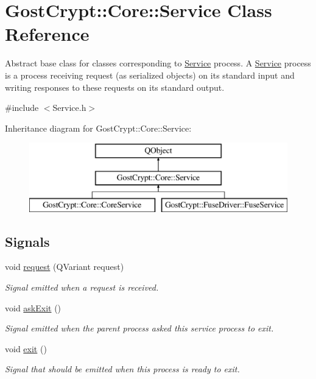 \hypertarget{class_gost_crypt_1_1_core_1_1_service}{}\section{Gost\+Crypt\+:\+:Core\+:\+:Service Class Reference}
\label{class_gost_crypt_1_1_core_1_1_service}


Abstract base class for classes corresponding to \hyperlink{class_gost_crypt_1_1_core_1_1_service}{Service} process. A \hyperlink{class_gost_crypt_1_1_core_1_1_service}{Service} process is a process receiving request (as serialized objects) on its standard input and writing responses to these requests on its standard output.  




{\ttfamily \#include $<$Service.\+h$>$}

Inheritance diagram for Gost\+Crypt\+:\+:Core\+:\+:Service\+:\begin{figure}[H]
\begin{center}
\leavevmode
\includegraphics[height=3.000000cm]{class_gost_crypt_1_1_core_1_1_service}
\end{center}
\end{figure}
\subsection*{Signals}
\begin{DoxyCompactItemize}
\item 
void \hyperlink{class_gost_crypt_1_1_core_1_1_service_af8bfb8d88823016319cd1943161283d3}{request} (Q\+Variant request)
\begin{DoxyCompactList}\small\item\em Signal emitted when a request is received. \end{DoxyCompactList}\item 
void \hyperlink{class_gost_crypt_1_1_core_1_1_service_acfca1e2dd3f0444b5c1f3a8e22c65db2}{ask\+Exit} ()
\begin{DoxyCompactList}\small\item\em Signal emitted when the parent process asked this service process to exit. \end{DoxyCompactList}\item 
void \hyperlink{class_gost_crypt_1_1_core_1_1_service_abd102ab9aa1e06bd9059af46996cb513}{exit} ()
\begin{DoxyCompactList}\small\item\em Signal that should be emitted when this process is ready to exit. \end{DoxyCompactList}\end{DoxyCompactItemize}
